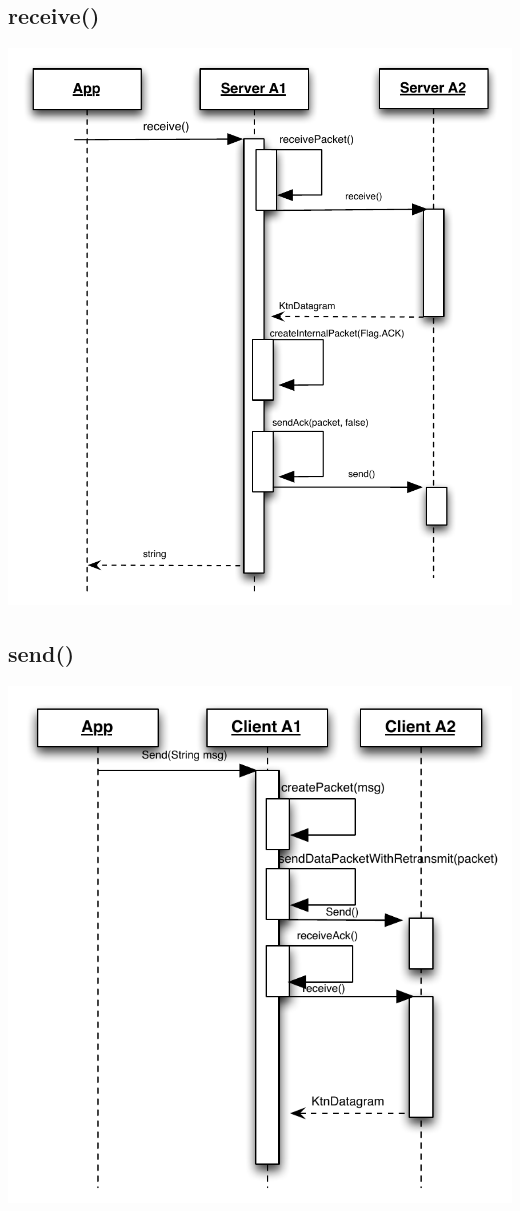 \documentclass{article}
\begin{document}
\subsection{receive()}
\includegraphics[scale=0.95]{ktnRecv.pdf}
\subsection{send()}
\includegraphics[scale=0.95]{ktnSend.pdf}
\newpage
\end{document}
